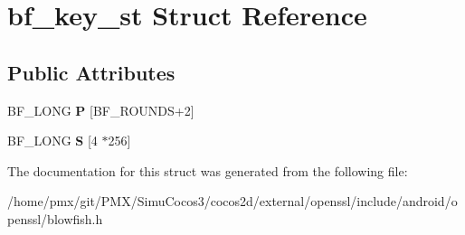 \hypertarget{structbf__key__st}{}\section{bf\+\_\+key\+\_\+st Struct Reference}
\label{structbf__key__st}
\subsection*{Public Attributes}
\begin{DoxyCompactItemize}
\item 
\mbox{\label{structbf__key__st_a467f42559a012fd46eaad84e5737172f}} 
B\+F\+\_\+\+L\+O\+NG {\bfseries P} \mbox{[}B\+F\+\_\+\+R\+O\+U\+N\+DS+2\mbox{]}
\item 
\mbox{\label{structbf__key__st_a433a64c61447b9008b22a0163c846bf7}} 
B\+F\+\_\+\+L\+O\+NG {\bfseries S} \mbox{[}4 $\ast$256\mbox{]}
\end{DoxyCompactItemize}


The documentation for this struct was generated from the following file\+:\begin{DoxyCompactItemize}
\item 
/home/pmx/git/\+P\+M\+X/\+Simu\+Cocos3/cocos2d/external/openssl/include/android/openssl/blowfish.\+h\end{DoxyCompactItemize}
